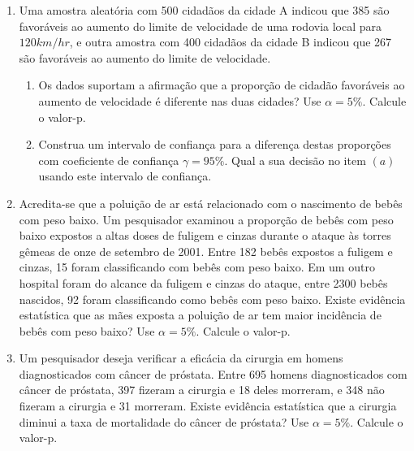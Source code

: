 \documentclass[8pt, a4paper]{article}
\begin{document}
\begin{enumerate}
	\item Uma amostra aleatória com 500 cidadãos da cidade A indicou que 385 são favoráveis ao aumento do limite de velocidade de uma rodovia local para $120 km/hr$, e outra amostra com 400 cidadãos da cidade B indicou que 267 são favoráveis ao aumento do limite de velocidade.
	\begin{enumerate}
		\item Os dados suportam a afirmação que a proporção de cidadão favoráveis ao aumento de velocidade é diferente nas duas cidades? Use $\alpha=5\%$. Calcule o valor-p.
		\item Construa um intervalo de confiança para a diferença destas proporções com coeficiente de confiança $\gamma=95\%$. Qual a sua decisão no item $(a)$ usando este intervalo de confiança.
	\end{enumerate}

	\item Acredita-se que a poluição de ar está relacionado com o nascimento de bebês com peso baixo. Um pesquisador examinou a proporção de bebês com peso baixo expostos a altas doses de fuligem e cinzas durante o ataque às torres gêmeas de onze de setembro de 2001. Entre 182 bebês expostos a fuligem e cinzas, 15 foram classificando com bebês com peso baixo. Em um outro hospital foram do alcance da fuligem e cinzas do ataque, entre 2300 bebês nascidos, 92 foram classificando como bebês com peso baixo. Existe evidência estatística que as mães exposta a poluição de ar tem maior incidência de bebês com peso baixo? Use $\alpha=5\%$. Calcule o valor-p.
	
	\item Um pesquisador deseja verificar a eficácia da cirurgia em homens diagnosticados com câncer de próstata. Entre 695 homens diagnosticados com câncer de próstata, 397 fizeram a cirurgia e 18 deles morreram, e 348 não fizeram a cirurgia e 31 morreram. Existe evidência estatística que a cirurgia diminui a taxa de mortalidade do câncer de próstata? Use $\alpha=5\%$. Calcule o valor-p.
\end{enumerate}
\end{document}
